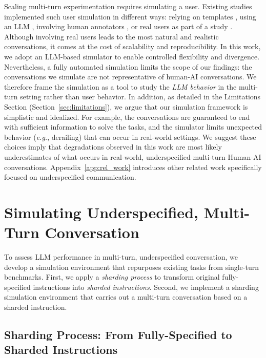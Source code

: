 \documentclass{article}
\begin{document}
Scaling multi-turn experimentation requires simulating a user.
Existing studies implemented such user simulation in different ways: relying on templates \cite{choi2018quac,reddy2019coqa,laban2023you,deng2024multi}, using an LLM \cite{poelitz2025synthetic,li2024iqa,chang2025chatbench,liang2024mathchat}, involving human annotators \cite{finch2023don,chang2025chatbench}, or real users as part of a study \cite{ram2018conversational,laban2021s,chiang2024chatbot}.
Although involving real users leads to the most natural and realistic conversations, it comes at the cost of scalability and reproducibility.
In this work, we adopt an LLM-based simulator to enable controlled flexibility and divergence.
Nevertheless, a fully automated simulation limits the scope of our findings: the conversations we simulate are not representative of human-AI conversations.
We therefore frame the simulation as a tool to study the \textit{LLM behavior} in the multi-turn setting rather than user behavior.
In addition, as detailed in the Limitations Section (Section~\ref{sec:limitations}), we argue that our simulation framework is simplistic and idealized.
For example, the conversations are guaranteed to end with sufficient information to solve the tasks, and the simulator limits unexpected behavior (\textit{e.g.}, derailing) that can occur in real-world settings.
We suggest these choices imply that degradations observed in this work are most likely underestimates of what occurs in real-world, underspecified multi-turn Human-AI conversations. Appendix~\ref{app:rel_work} introduces other related work specifically focused on underspecified communication.

\section{Simulating Underspecified, Multi-Turn Conversation} \label{sec:simulation}

To assess LLM performance in multi-turn, underspecified conversation, we develop a simulation environment that repurposes existing tasks from single-turn benchmarks. First, we apply a \textit{sharding process} to transform original fully-specified instructions into \textit{sharded instructions}. Second, we implement a sharding simulation environment that carries out a multi-turn conversation based on a sharded instruction.

\subsection{Sharding Process: From Fully-Specified to Sharded Instructions} \label{ssec:sharding_concept}
\end{document}
